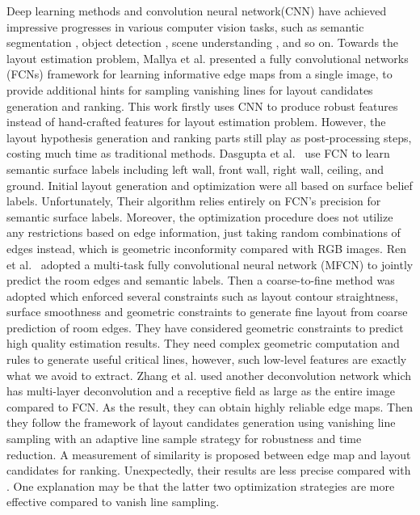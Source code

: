 {%
Deep learning methods and convolution neural network(CNN) have achieved impressive progresses in various computer vision tasks, such as semantic segmentation \cite{long2015fully,chen2016deeplab}, object detection \cite{girshick2015fast,ren2015faster}, scene understanding \cite{gupta2015indoor,badrinarayanan2017segnet}, and so on.
%
Towards the layout estimation problem, Mallya et al.\cite{mallya2015learning} presented a fully convolutional networks (FCNs) framework for learning informative edge maps from a single image, to provide additional hints for sampling vanishing lines for layout candidates generation and ranking. 
%
This work firstly uses CNN to produce robust features instead of hand-crafted features for layout estimation problem. However, the layout hypothesis generation and ranking parts still play as post-processing steps, costing much time as traditional methods. 
%
Dasgupta et al.~\cite{dasgupta2016delay} use FCN to learn semantic surface labels including left wall, front wall, right wall, ceiling, and ground. 
Initial layout generation and optimization were all based on surface belief labels. 
Unfortunately, Their algorithm relies entirely on FCN's precision for semantic surface labels. 
%
Moreover, the optimization procedure does not utilize any restrictions based on edge information, just taking random combinations of edges instead, which is geometric inconformity compared with RGB images. 
%
Ren et al.~\cite{ren2016coarse} adopted a multi-task fully convolutional neural network (MFCN) to jointly predict the room edges and semantic labels. 
Then a coarse-to-fine method was adopted which enforced several constraints such as layout contour straightness, surface smoothness and geometric constraints to generate fine layout from coarse prediction of room edges. 
%
They have considered geometric constraints to predict high quality estimation results. They need complex geometric computation and rules to generate useful critical lines, however, such low-level features are exactly what we avoid to extract. 
%
Zhang et al.\cite{zhang2016learning} used another deconvolution network which has multi-layer deconvolution and a receptive field as large as the entire image compared to FCN. As the result, they can obtain highly reliable edge maps. Then they follow the framework of layout candidates generation using vanishing line sampling with an adaptive line sample strategy for robustness and time reduction. A measurement of similarity is proposed between edge map and layout candidates for ranking. 
Unexpectedly, their results are less precise compared with \cite{dasgupta2016delay,ren2016coarse}. 
One explanation may be that the latter two optimization strategies are more effective compared to vanish line sampling.
%
}